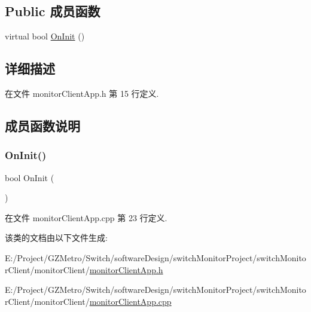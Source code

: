\subsection*{Public 成员函数}
\begin{DoxyCompactItemize}
\item 
virtual bool \hyperlink{classmonitor_client_app_aa632f0b3197adeb7777ee5d14a2ac639}{On\+Init} ()
\end{DoxyCompactItemize}


\subsection{详细描述}


在文件 monitor\+Client\+App.\+h 第 15 行定义.



\subsection{成员函数说明}
\mbox{\label{classmonitor_client_app_aa632f0b3197adeb7777ee5d14a2ac639}} 
\subsubsection{\texorpdfstring{On\+Init()}{OnInit()}}
{\footnotesize\ttfamily bool On\+Init (\begin{DoxyParamCaption}{ }\end{DoxyParamCaption})\hspace{0.3cm}{\ttfamily [virtual]}}



在文件 monitor\+Client\+App.\+cpp 第 23 行定义.



该类的文档由以下文件生成\+:\begin{DoxyCompactItemize}
\item 
E\+:/\+Project/\+G\+Z\+Metro/\+Switch/software\+Design/switch\+Monitor\+Project/switch\+Monitor\+Client/monitor\+Client/\hyperlink{monitor_client_app_8h}{monitor\+Client\+App.\+h}\item 
E\+:/\+Project/\+G\+Z\+Metro/\+Switch/software\+Design/switch\+Monitor\+Project/switch\+Monitor\+Client/monitor\+Client/\hyperlink{monitor_client_app_8cpp}{monitor\+Client\+App.\+cpp}\end{DoxyCompactItemize}

